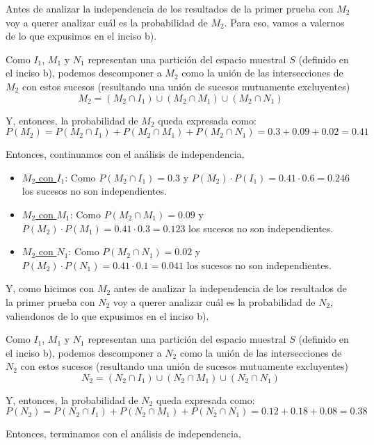 \documentclass[11pt]{article}
\begin{document}
Antes de analizar la independencia de los resultados de la primer prueba con $M_{2}$ voy a querer analizar cu\'al es la probabilidad de $M_{2}$. Para eso, vamos a valernos de lo que expusimos en el inciso b). 

Como $I_{1}$, $M_{1}$ y $N_{1}$ representan una partici\'on del espacio muestral $S$ (definido en el inciso b), podemos descomponer a $M_{2}$ como la uni\'on de las intersecciones de $M_{2}$ con estos sucesos (resultando una uni\'on de sucesos mutuamente excluyentes)
\[M_{2} = (M_{2} \cap I_{1}) \cup (M_{2} \cap M_{1}) \cup (M_{2} \cap N_{1}) \]

Y, entonces, la probabilidad de $M_{2}$ queda expresada como: 
\[P(M_{2}) = P(M_{2}\cap I_{1}) + P(M_{2}\cap M_{1}) + P(M_{2}\cap N_{1}) = 0.3 + 0.09 + 0.02 = 0.41 \]

Entonces, continuamos con el an\'alisis de independencia,

\begin{itemize}
    \item \underline{$M_{2}$ con $I_{1}$}: Como $P(M_{2}\cap I_{1}) = 0.3$ y $P(M_{2})\cdot P(I_{1}) = 0.41\cdot 0.6 = 0.246$ los sucesos no son independientes. 
    \item \underline{$M_{2}$ con $M_{1}$}: Como $P(M_{2}\cap M_{1}) = 0.09$ y $P(M_{2})\cdot P(M_{1}) = 0.41\cdot 0.3 = 0.123$ los sucesos no son independientes. 
    \item \underline{$M_{2}$ con $N_{1}$}: Como $P(M_{2}\cap N_{1}) = 0.02$ y $P(M_{2})\cdot P(N_{1}) = 0.41\cdot 0.1 = 0.041$ los sucesos no son independientes. 
\end{itemize}

Y, como hicimos con $M_{2}$ antes de analizar la independencia de los resultados de la primer prueba con $N_{2}$ voy a querer analizar cu\'al es la probabilidad de $N_{2}$, valiendonos de lo que expusimos en el inciso b). 

Como $I_{1}$, $M_{1}$ y $N_{1}$ representan una partici\'on del espacio muestral $S$ (definido en el inciso b), podemos descomponer a $N_{2}$ como la uni\'on de las intersecciones de $N_{2}$ con estos sucesos (resultando una uni\'on de sucesos mutuamente excluyentes)
\[N_{2} = (N_{2} \cap I_{1}) \cup (N_{2} \cap M_{1}) \cup (N_{2} \cap N_{1}) \]

Y, entonces, la probabilidad de $N_{2}$ queda expresada como: 
\[P(N_{2}) = P(N_{2} \cap I_{1}) + P(N_{2} \cap M_{1}) + P(N_{2} \cap N_{1}) = 0.12 + 0.18 + 0.08 = 0.38 \]

Entonces, terminamos con el an\'alisis de independencia,
\end{document}
